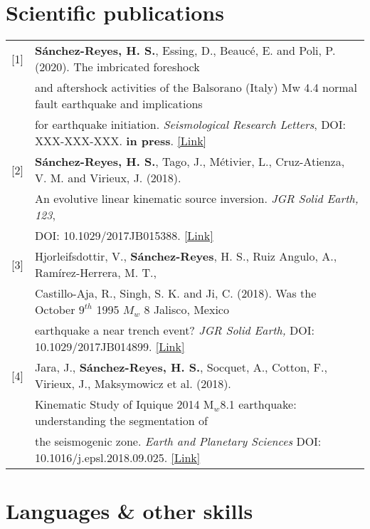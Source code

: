 \documentclass[a4paper,10.5pt]{article} %
\begin{document}
\section{Scientific publications}
\begin{tabular}{ll}
 [1] & {\bf S\'anchez-Reyes, H. S.}, Essing, D., Beauc\'e, E. and Poli, P. (2020). The imbricated foreshock  \tabularnewline
     & and aftershock activities of the Balsorano (Italy) Mw 4.4 normal fault earthquake and implications \\
     & for earthquake initiation. {\it Seismological Research Letters}, DOI: XXX-XXX-XXX. {\bf in press}. \href{https://github.com/hugosanrocks/hugosanrocks.github.com/blob/master/tex_documents/drafts/2020_SRL/2019_Balsorano_final_draft.pdf}{[Link]} \\[0.6em]

 [2] & {\bf S\'anchez-Reyes, H. S.}, Tago, J., Métivier, L., Cruz-Atienza, V. M. and Virieux, J. (2018). \tabularnewline 
     & An evolutive linear kinematic source inversion. {\it JGR Solid Earth, 123}, \\
     & DOI: 10.1029/2017JB015388. \href{https://agupubs.onlinelibrary.wiley.com/doi/10.1029/2017JB015388}{[Link]} \\[0.6em]

 [3] & Hjorleifsdottir, V., {\bf S\'anchez-Reyes}, H. S., Ruiz Angulo, A., Ramírez-Herrera, M. T., \tabularnewline
     & Castillo-Aja, R., Singh, S. K. and Ji, C. (2018). Was the October $9^{th}$ 1995 $M_w$ 8 Jalisco, Mexico \\
     & earthquake a near trench event? {\it JGR Solid Earth,} DOI: 10.1029/2017JB014899. \href{https://agupubs.onlinelibrary.wiley.com/doi/10.1029/2017JB014899}{[Link]} \\[0.6em]
     
 [4] & Jara, J., {\bf S\'anchez-Reyes, H. S.}, Socquet, A., Cotton, F., Virieux, J., Maksymowicz et al. (2018). \\
     & Kinematic Study of Iquique 2014 M$_w$8.1 earthquake: understanding the segmentation of \\
     & the seismogenic zone. {\it Earth and Planetary Sciences} DOI: 10.1016/j.epsl.2018.09.025. \href{https://www.sciencedirect.com/science/article/pii/S0012821X18305648}{[Link]} \\[0.6em]
     
\end{tabular}

\vskip 0.2cm
\section{Languages \hspace{0.55cm} \& \hspace{0.55cm} other skills}
\end{document}
